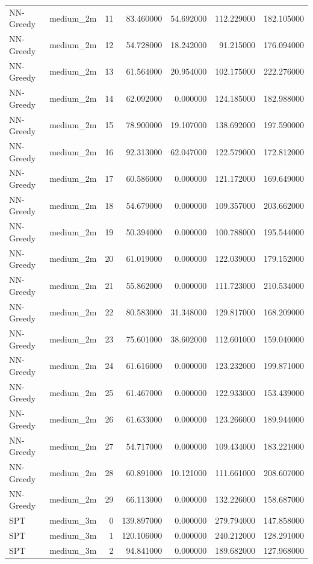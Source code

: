 \begin{tabular}{llrrrrr}
NN-Greedy & medium_2m & 11 & 83.460000 & 54.692000 & 112.229000 & 182.105000 \\
NN-Greedy & medium_2m & 12 & 54.728000 & 18.242000 & 91.215000 & 176.094000 \\
NN-Greedy & medium_2m & 13 & 61.564000 & 20.954000 & 102.175000 & 222.276000 \\
NN-Greedy & medium_2m & 14 & 62.092000 & 0.000000 & 124.185000 & 182.988000 \\
NN-Greedy & medium_2m & 15 & 78.900000 & 19.107000 & 138.692000 & 197.590000 \\
NN-Greedy & medium_2m & 16 & 92.313000 & 62.047000 & 122.579000 & 172.812000 \\
NN-Greedy & medium_2m & 17 & 60.586000 & 0.000000 & 121.172000 & 169.649000 \\
NN-Greedy & medium_2m & 18 & 54.679000 & 0.000000 & 109.357000 & 203.662000 \\
NN-Greedy & medium_2m & 19 & 50.394000 & 0.000000 & 100.788000 & 195.544000 \\
NN-Greedy & medium_2m & 20 & 61.019000 & 0.000000 & 122.039000 & 179.152000 \\
NN-Greedy & medium_2m & 21 & 55.862000 & 0.000000 & 111.723000 & 210.534000 \\
NN-Greedy & medium_2m & 22 & 80.583000 & 31.348000 & 129.817000 & 168.209000 \\
NN-Greedy & medium_2m & 23 & 75.601000 & 38.602000 & 112.601000 & 159.040000 \\
NN-Greedy & medium_2m & 24 & 61.616000 & 0.000000 & 123.232000 & 199.871000 \\
NN-Greedy & medium_2m & 25 & 61.467000 & 0.000000 & 122.933000 & 153.439000 \\
NN-Greedy & medium_2m & 26 & 61.633000 & 0.000000 & 123.266000 & 189.944000 \\
NN-Greedy & medium_2m & 27 & 54.717000 & 0.000000 & 109.434000 & 183.221000 \\
NN-Greedy & medium_2m & 28 & 60.891000 & 10.121000 & 111.661000 & 208.607000 \\
NN-Greedy & medium_2m & 29 & 66.113000 & 0.000000 & 132.226000 & 158.687000 \\
SPT & medium_3m & 0 & 139.897000 & 0.000000 & 279.794000 & 147.858000 \\
SPT & medium_3m & 1 & 120.106000 & 0.000000 & 240.212000 & 128.291000 \\
SPT & medium_3m & 2 & 94.841000 & 0.000000 & 189.682000 & 127.968000 \\

\end{tabular}
